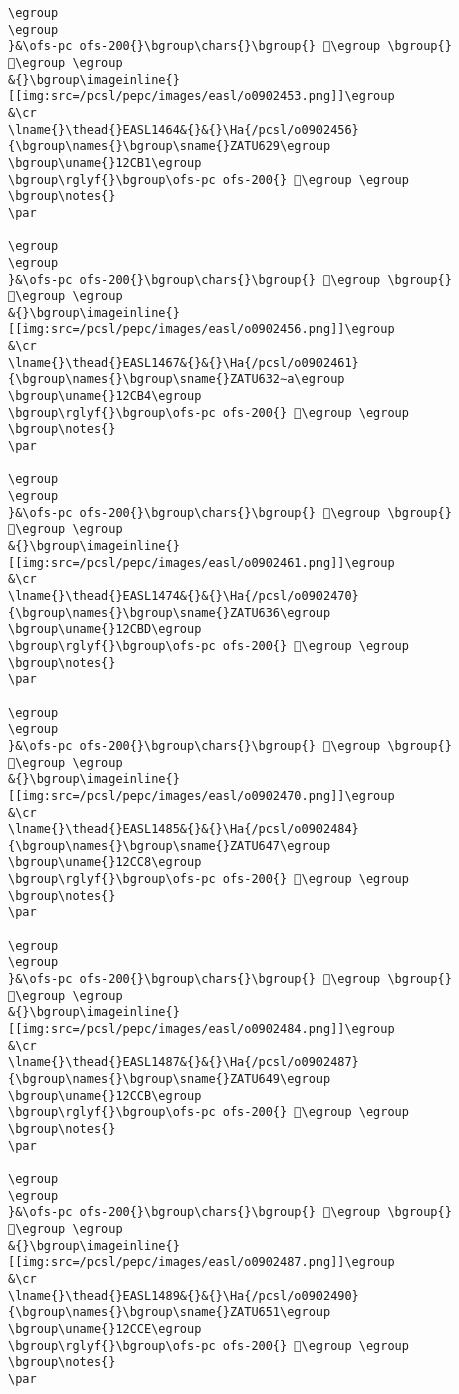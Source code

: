 \begin{verbatim}
\egroup
\egroup
}&\ofs-pc ofs-200{}\bgroup\chars{}\bgroup{} 𒲭\egroup \bgroup{} 𒲮\egroup \egroup
&{}\bgroup\imageinline{}[[img:src=/pcsl/pepc/images/easl/o0902453.png]]\egroup
&\cr
\lname{}\thead{}EASL1464&{}&{}\Ha{/pcsl/o0902456}{\bgroup\names{}\bgroup\sname{}ZATU629\egroup
\bgroup\uname{}12CB1\egroup
\bgroup\rglyf{}\bgroup\ofs-pc ofs-200{} 𒲱\egroup \egroup
\bgroup\notes{}
\par 

\egroup
\egroup
}&\ofs-pc ofs-200{}\bgroup\chars{}\bgroup{} 𒲰\egroup \bgroup{} 𒲱\egroup \egroup
&{}\bgroup\imageinline{}[[img:src=/pcsl/pepc/images/easl/o0902456.png]]\egroup
&\cr
\lname{}\thead{}EASL1467&{}&{}\Ha{/pcsl/o0902461}{\bgroup\names{}\bgroup\sname{}ZATU632∼a\egroup
\bgroup\uname{}12CB4\egroup
\bgroup\rglyf{}\bgroup\ofs-pc ofs-200{} 𒲴\egroup \egroup
\bgroup\notes{}
\par 

\egroup
\egroup
}&\ofs-pc ofs-200{}\bgroup\chars{}\bgroup{} 𒲴\egroup \bgroup{} 𒲵\egroup \egroup
&{}\bgroup\imageinline{}[[img:src=/pcsl/pepc/images/easl/o0902461.png]]\egroup
&\cr
\lname{}\thead{}EASL1474&{}&{}\Ha{/pcsl/o0902470}{\bgroup\names{}\bgroup\sname{}ZATU636\egroup
\bgroup\uname{}12CBD\egroup
\bgroup\rglyf{}\bgroup\ofs-pc ofs-200{} 𒲽\egroup \egroup
\bgroup\notes{}
\par 

\egroup
\egroup
}&\ofs-pc ofs-200{}\bgroup\chars{}\bgroup{} 𒲼\egroup \bgroup{} 𒲽\egroup \egroup
&{}\bgroup\imageinline{}[[img:src=/pcsl/pepc/images/easl/o0902470.png]]\egroup
&\cr
\lname{}\thead{}EASL1485&{}&{}\Ha{/pcsl/o0902484}{\bgroup\names{}\bgroup\sname{}ZATU647\egroup
\bgroup\uname{}12CC8\egroup
\bgroup\rglyf{}\bgroup\ofs-pc ofs-200{} 𒳈\egroup \egroup
\bgroup\notes{}
\par 

\egroup
\egroup
}&\ofs-pc ofs-200{}\bgroup\chars{}\bgroup{} 𒳈\egroup \bgroup{} 𒳉\egroup \egroup
&{}\bgroup\imageinline{}[[img:src=/pcsl/pepc/images/easl/o0902484.png]]\egroup
&\cr
\lname{}\thead{}EASL1487&{}&{}\Ha{/pcsl/o0902487}{\bgroup\names{}\bgroup\sname{}ZATU649\egroup
\bgroup\uname{}12CCB\egroup
\bgroup\rglyf{}\bgroup\ofs-pc ofs-200{} 𒳋\egroup \egroup
\bgroup\notes{}
\par 

\egroup
\egroup
}&\ofs-pc ofs-200{}\bgroup\chars{}\bgroup{} 𒳋\egroup \bgroup{} 𒳌\egroup \egroup
&{}\bgroup\imageinline{}[[img:src=/pcsl/pepc/images/easl/o0902487.png]]\egroup
&\cr
\lname{}\thead{}EASL1489&{}&{}\Ha{/pcsl/o0902490}{\bgroup\names{}\bgroup\sname{}ZATU651\egroup
\bgroup\uname{}12CCE\egroup
\bgroup\rglyf{}\bgroup\ofs-pc ofs-200{} 𒳎\egroup \egroup
\bgroup\notes{}
\par 


\end{verbatim}
